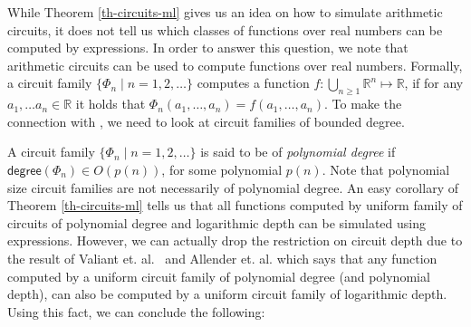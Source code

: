 %



\smallskip
While Theorem \ref{th-circuits-ml} gives us an idea on how to simulate arithmetic circuits, it does not tell us which classes of functions over real numbers can be computed by \langfor expressions. In order to answer this question, we note that arithmetic circuits can be used to compute functions over real numbers. Formally, a circuit family $\{\Phi_n\mid n=1,2,\ldots\}$ computes a function $f:\bigcup_{n\geq 1} \mathbb{R}^n\mapsto\mathbb{R}$, if for any $a_1,\ldots a_n\in \mathbb{R}$ it holds that $\Phi_n(a_1,\ldots ,a_n) = f(a_1,\ldots ,a_n)$. To make the connection with \langfor\!, we need to look at circuit families of bounded degree. 

A circuit family $\{\Phi_n\mid n=1,2,\ldots\}$ is said to be of \textit{polynomial degree} if $\mathsf{degree}(\Phi_n)\in O(p(n))$, for some polynomial $p(n)$. Note that polynomial size circuit families are not necessarily of polynomial degree. An easy corollary of Theorem \ref{th-circuits-ml} tells us that all functions computed by uniform family of circuits of polynomial degree and logarithmic depth can be simulated using \langfor expressions. However, we can actually drop the restriction on circuit depth due to the result of Valiant et. al.~\cite{valiant1981fast} and Allender et. al. \cite{AllenderJMV98} which says that any function computed by a uniform circuit family of polynomial degree (and polynomial depth), can also be computed by a uniform circuit family of logarithmic depth. Using this fact, we can conclude the following:


